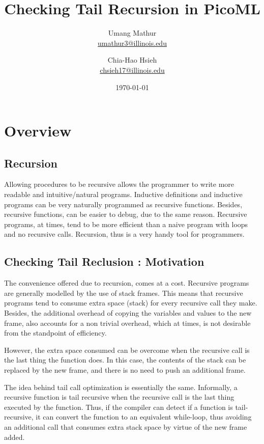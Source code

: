 \documentclass{article}
\title{Checking Tail Recursion in PicoML}
\author{Umang Mathur \\ \href{mailto:umathur3@illinois.edu}{umathur3@illinois.edu}
\and Chia-Hao Hsieh \\ \href{mailto:chsieh17@illinois.edu}{chsieh17@illinois.edu}}
\date{\today}
\begin{document}
\maketitle

\section{Overview}

\subsection{Recursion}
\hspace{0.2in} Allowing  procedures to be recursive allows the programmer to write more readable and intuitive/natural programs. 
Inductive definitions and inductive programs can be very naturally programmed as recursive functions.
Besides, recursive functions, can be easier to debug, due to the same reason.
Recursive programs, at times, tend to be more efficient than a naive program with loops and no recursive calls. 
Recursion, thus is a very handy tool for programmers.

\subsection{Checking Tail Reclusion : Motivation}

\hspace{0.2in} The convenience offered due to recursion, comes at a cost. 
Recursive programs are generally modelled by the use of stack frames. 
This means that recursive programs tend to consume extra space (stack) for every recursive call they make.
Besides, the additional overhead of copying the variables and values to the new frame, also accounts for a non trivial overhead, which at times, is not desirable from the standpoint of efficiency.

However, the extra space consumed can be overcome when the recursive call is the last thing the function does. 
In this case, the contents of the stack can be replaced by the new frame, and there is no need to push an additional frame.

The idea behind tail call optimization is essentially the same. 
Informally, a recursive function is tail recursive when the recursive call is the last thing executed by the function. 
Thus, if the compiler can detect if a function is tail-recursive, it can convert the function to an equivalent while-loop, thus avoiding an additional call that consumes extra stack space by virtue of the new frame added.
\end{document}
